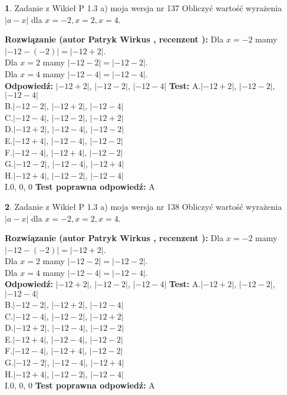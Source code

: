 \documentclass[12pt, a4paper]{article}
\theoremstyle{definition} %
\newtheorem{zad}{}
\newcommand{\zadStart}[1]{\begin{zad}#1\newline}
\newcommand{\zadStop}{\end{zad}}
\newcommand{\rozwStart}[2]{\noindent \textbf{Rozwiązanie (autor #1 , recenzent #2): }\newline}
\newcommand{\rozwStop}{\newline}
\newcommand{\odpStart}{\noindent \textbf{Odpowiedź:}\newline}
\newcommand{\odpStop}{\newline}
\newcommand{\testStart}{\noindent \textbf{Test:}\newline}
\newcommand{\testStop}{\newline}
\newcommand{\kluczStart}{\noindent \textbf{Test poprawna odpowiedź:}\newline}
\newcommand{\kluczStop}{\newline}
\begin{document}
\zadStart{Zadanie z Wikieł P 1.3 a) moja wersja nr 137}
Obliczyć wartość wyrażenia $|a - x|$ dla $x=-2,x=2,x=4$.
\zadStop
\rozwStart{Patryk Wirkus}{}
Dla $x = -2$ mamy $|-12 - (-2)| = |-12 + 2|$.\\
Dla $x = 2$ mamy $|-12 - 2| = |-12 - 2|$.\\
Dla $x = 4$ mamy $|-12 - 4| = |-12 - 4|$.\\
\rozwStop
\odpStart
$|-12 + 2|$, $|-12 - 2|$, $|-12 - 4|$
\odpStop
\testStart
A.$|-12 + 2|$, $|-12 - 2|$, $|-12 - 4|$\\
B.$|-12 - 2|$, $|-12 + 2|$, $|-12 - 4|$\\
C.$|-12 - 4|$, $|-12 - 2|$, $|-12 + 2|$\\
D.$|-12 + 2|$, $|-12 - 4|$, $|-12 - 2|$\\
E.$|-12 + 4|$, $|-12 - 4|$, $|-12 - 2|$\\
F.$|-12 - 4|$, $|-12 + 4|$, $|-12 - 2|$\\
G.$|-12 - 2|$, $|-12 - 4|$, $|-12 + 4|$\\
H.$|-12 + 4|$, $|-12 - 2|$, $|-12 - 4|$\\
I.$0$, $0$, $0$
\testStop
\kluczStart
A
\kluczStop



\zadStart{Zadanie z Wikieł P 1.3 a) moja wersja nr 138}
Obliczyć wartość wyrażenia $|a - x|$ dla $x=-2,x=2,x=4$.
\zadStop
\rozwStart{Patryk Wirkus}{}
Dla $x = -2$ mamy $|-12 - (-2)| = |-12 + 2|$.\\
Dla $x = 2$ mamy $|-12 - 2| = |-12 - 2|$.\\
Dla $x = 4$ mamy $|-12 - 4| = |-12 - 4|$.\\
\rozwStop
\odpStart
$|-12 + 2|$, $|-12 - 2|$, $|-12 - 4|$
\odpStop
\testStart
A.$|-12 + 2|$, $|-12 - 2|$, $|-12 - 4|$\\
B.$|-12 - 2|$, $|-12 + 2|$, $|-12 - 4|$\\
C.$|-12 - 4|$, $|-12 - 2|$, $|-12 + 2|$\\
D.$|-12 + 2|$, $|-12 - 4|$, $|-12 - 2|$\\
E.$|-12 + 4|$, $|-12 - 4|$, $|-12 - 2|$\\
F.$|-12 - 4|$, $|-12 + 4|$, $|-12 - 2|$\\
G.$|-12 - 2|$, $|-12 - 4|$, $|-12 + 4|$\\
H.$|-12 + 4|$, $|-12 - 2|$, $|-12 - 4|$\\
I.$0$, $0$, $0$
\testStop
\kluczStart
A
\kluczStop
\end{document}
